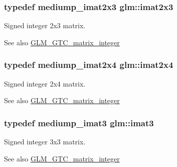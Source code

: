 \subsubsection[{\texorpdfstring{imat2x3}{imat2x3}}]{\setlength{\rightskip}{0pt plus 5cm}typedef mediump\+\_\+imat2x3 {\bf glm\+::imat2x3}}\hypertarget{group__gtc__matrix__integer_ga143bc5177bac9991d84b70da03952516}{}\label{group__gtc__matrix__integer_ga143bc5177bac9991d84b70da03952516}
Signed integer 2x3 matrix. \begin{DoxySeeAlso}{See also}
\hyperlink{group__gtc__matrix__integer}{G\+L\+M\+\_\+\+G\+T\+C\+\_\+matrix\+\_\+integer} 
\end{DoxySeeAlso}
\subsubsection[{\texorpdfstring{imat2x4}{imat2x4}}]{\setlength{\rightskip}{0pt plus 5cm}typedef mediump\+\_\+imat2x4 {\bf glm\+::imat2x4}}\hypertarget{group__gtc__matrix__integer_gafe2d058e164fd1badace451ffcf4ae46}{}\label{group__gtc__matrix__integer_gafe2d058e164fd1badace451ffcf4ae46}
Signed integer 2x4 matrix. \begin{DoxySeeAlso}{See also}
\hyperlink{group__gtc__matrix__integer}{G\+L\+M\+\_\+\+G\+T\+C\+\_\+matrix\+\_\+integer} 
\end{DoxySeeAlso}
\subsubsection[{\texorpdfstring{imat3}{imat3}}]{\setlength{\rightskip}{0pt plus 5cm}typedef mediump\+\_\+imat3 {\bf glm\+::imat3}}\hypertarget{group__gtc__matrix__integer_ga45481922dd07a3a8e23758286311ee97}{}\label{group__gtc__matrix__integer_ga45481922dd07a3a8e23758286311ee97}
Signed integer 3x3 matrix. \begin{DoxySeeAlso}{See also}
\hyperlink{group__gtc__matrix__integer}{G\+L\+M\+\_\+\+G\+T\+C\+\_\+matrix\+\_\+integer} 
\end{DoxySeeAlso}
